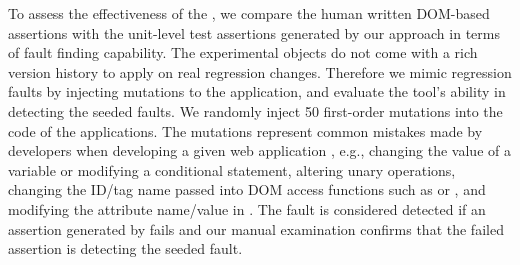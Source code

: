  To assess the effectiveness of the \tool, we compare the human written DOM-based assertions with the unit-level test assertions generated by our approach in terms of fault finding capability.
The experimental objects do not come with a rich version history to apply \tool on real regression changes. Therefore we mimic regression faults by injecting mutations to the application, and evaluate the tool's ability in detecting the seeded faults. We randomly inject 50 first-order mutations into the \javascript code of the applications. The mutations represent common mistakes made by developers when developing a given web application \cite{mirshokraie:icst13}, e.g., changing the value of a variable or modifying a conditional statement, altering unary operations, changing the ID/tag name passed into DOM access functions such as  or , and modifying the attribute name/value in . The fault is considered detected if an assertion generated by \tool fails and our manual examination confirms that the failed assertion is detecting the seeded fault.